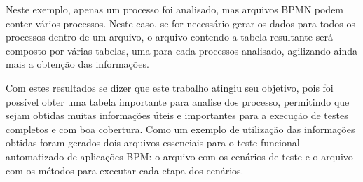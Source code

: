 \documentclass[12pt]{article}
\begin{document}

Neste exemplo, apenas um processo foi analisado, mas arquivos BPMN podem conter vários processos. Neste caso, se for necessário gerar os dados para todos os processos dentro de um arquivo, o arquivo contendo a tabela resultante será composto por várias tabelas, uma para cada processos analisado, agilizando ainda mais a obtenção das informações. 





Com estes resultados se dizer que este trabalho atingiu seu objetivo, pois foi possível obter uma tabela importante para analise dos processo, permitindo que sejam obtidas muitas informações úteis e importantes para a execução de testes completos e com boa cobertura. Como um exemplo de utilização das informações obtidas foram gerados dois arquivos essenciais para o teste funcional automatizado de aplicações BPM: o arquivo com os cenários de teste e o arquivo com os métodos para executar cada etapa dos cenários.

\end{document}
